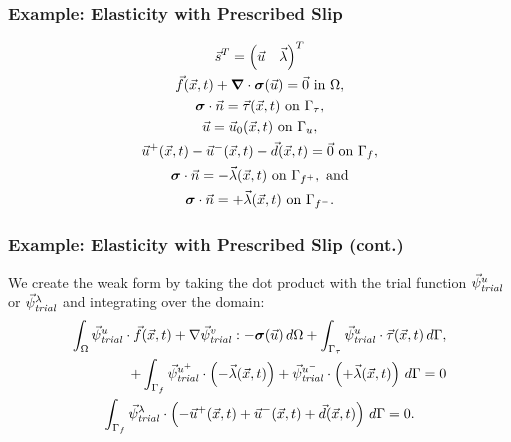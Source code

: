 \documentclass[aspectratio=169]{beamer}
\begin{document}
\begin{frame}
  \frametitle{Example: Elasticity with Prescribed Slip}



  \begin{gather}
    \vec{s}^T = \left( \vec{u} \quad \vec{\lambda} \right)^T \\
    \vec{f}(\vec{x},t) + \tensor{\nabla} \cdot \tensor{\sigma}(\vec{u}) = \vec{0} \text{ in }\Omega, \\
    \tensor{\sigma} \cdot \vec{n} = \vec{\tau}(\vec{x},t) \text{ on }\Gamma_\tau, \\
    \vec{u} = \vec{u}_0(\vec{x},t) \text{ on }\Gamma_u, \\
    \vec{u}^+(\vec{x},t) - \vec{u}^-(\vec{x},t) - \vec{d}(\vec{x},t) = \vec{0} \text{ on }\Gamma_f,  \\
    \tensor{\sigma} \cdot \vec{n} = -\vec{\lambda}(\vec{x},t) \text{ on }\Gamma_{f^+}, \text{ and}\\
    \tensor{\sigma} \cdot \vec{n} = +\vec{\lambda}(\vec{x},t) \text{ on }\Gamma_{f^-}.
  \end{gather}

\end{frame}


\begin{frame}
  \frametitle{Example: Elasticity with Prescribed Slip (cont.)}
  \summary{}

We create the weak form by taking the dot product with the trial function $\trialvec[u]$ or $\trialvec[\lambda]$ and integrating over the domain:
\begin{gather}
  \begin{split}
  \int_\Omega \trialvec[u] \cdot \vec{f}(\vec{x},t) + \nabla \trialvec[v] : -\tensor{\sigma}(\vec{u}) \, d\Omega
  + \int_{\Gamma_\tau} \trialvec[u] \cdot \vec{\tau}(\vec{x},t) \, d\Gamma, \\
  + \int_{\Gamma_{f}} \trialvec[u^+] \cdot \left(-\vec{\lambda}(\vec{x},t)\right)
  + \trialvec[u^-] \cdot \left(+\vec{\lambda}(\vec{x},t)\right)\, d\Gamma = 0
\end{split}\\
  \int_{\Gamma_{f}} \trialvec[\lambda] \cdot \left(
    -\vec{u}^+(\vec{x},t) + \vec{u}^-(\vec{x},t) + \vec{d}(\vec{x},t) \right) \, d\Gamma = 0.
\end{gather}

\end{frame}
\end{document}

